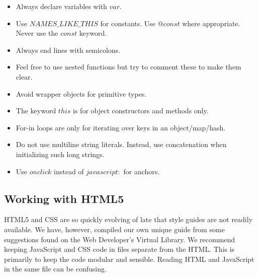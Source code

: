\documentclass[12pt]{article}
\begin{document}
\begin{itemize}

\item Always declare variables with $var$.

\item Use $NAMES\_LIKE\_THIS$ for constants. Use $@const$ where appropriate. Never use the $const$ keyword.

\item Always end lines with semicolons.

\item Feel free to use nested functions but try to comment these to make them clear.

\item Avoid wrapper objects for primitive types.

\item The keyword $this$ is for object constructors and methods only.

\item For-in loops are only for iterating over keys in an object/map/hash.

\item Do not use multiline string literals.  Instead, use concatenation when initializing such long strings.

\item Use $onclick$ instead of $javascript:$ for anchors.

\end{itemize}



\subsection{Working with HTML5}

HTML5 and CSS are so quickly evolving of late that style guides are not readily available.  We have, however, compiled our own unique guide from some suggestions found on the Web Developer's Virtual Library\cite{HTMLStyle-WDVL}.  We recommend keeping JavaScript and CSS code in files separate from the HTML.  This is primarily to keep the code modular and sensible.  Reading HTML and JavaScript in the same file can be confusing.
\end{document}
